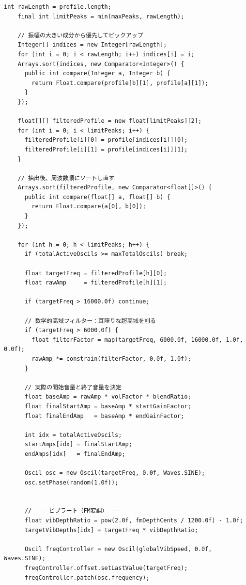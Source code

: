 \begin{lstlisting}[caption={Strings.pde}, label={lst:proc_strings}]
    int rawLength = profile.length;
    final int limitPeaks = min(maxPeaks, rawLength);
    
    // 振幅の大きい成分から優先してピックアップ
    Integer[] indices = new Integer[rawLength];
    for (int i = 0; i < rawLength; i++) indices[i] = i;
    Arrays.sort(indices, new Comparator<Integer>() {
      public int compare(Integer a, Integer b) {
        return Float.compare(profile[b][1], profile[a][1]);
      }
    });
    
    float[][] filteredProfile = new float[limitPeaks][2];
    for (int i = 0; i < limitPeaks; i++) {
      filteredProfile[i][0] = profile[indices[i]][0]; 
      filteredProfile[i][1] = profile[indices[i]][1]; 
    }
    
    // 抽出後、周波数順にソートし直す
    Arrays.sort(filteredProfile, new Comparator<float[]>() {
      public int compare(float[] a, float[] b) {
        return Float.compare(a[0], b[0]);
      }
    });
    
    for (int h = 0; h < limitPeaks; h++) {
      if (totalActiveOscils >= maxTotalOscils) break;
      
      float targetFreq = filteredProfile[h][0]; 
      float rawAmp     = filteredProfile[h][1]; 
      
      if (targetFreq > 16000.0f) continue;
      
      // 数学的高域フィルター：耳障りな超高域を削る
      if (targetFreq > 6000.0f) {
        float filterFactor = map(targetFreq, 6000.0f, 16000.0f, 1.0f, 0.0f);
        rawAmp *= constrain(filterFactor, 0.0f, 1.0f);
      }
      
      // 実際の開始音量と終了音量を決定
      float baseAmp = rawAmp * volFactor * blendRatio;
      float finalStartAmp = baseAmp * startGainFactor;
      float finalEndAmp   = baseAmp * endGainFactor;
      
      int idx = totalActiveOscils;
      startAmps[idx] = finalStartAmp;
      endAmps[idx]   = finalEndAmp;
      
      Oscil osc = new Oscil(targetFreq, 0.0f, Waves.SINE);
      osc.setPhase(random(1.0f));
      
      
      // --- ビブラート（FM変調） ---
      float vibDepthRatio = pow(2.0f, fmDepthCents / 1200.0f) - 1.0f;
      targetVibDepths[idx] = targetFreq * vibDepthRatio;
      
      Oscil freqController = new Oscil(globalVibSpeed, 0.0f, Waves.SINE);
      freqController.offset.setLastValue(targetFreq);
      freqController.patch(osc.frequency);
      

\end{lstlisting}
